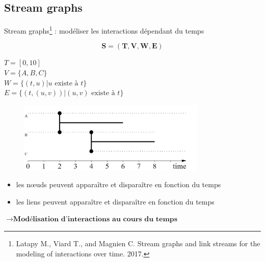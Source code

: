\documentclass[15pt]{beamer}
\def \Stgs {Stream graphs}
\begin{document}
\subsection{Stream graphs}

\begin{frame}{\Stgs{}\footnote{Latapy M., Viard T., and Magnien C. Stream graphs and link streams for the modeling of interactions over time. 2017.} : modéliser les interactions dépendant du temps}


\medskip

\begin{minipage}{0.43\textwidth}
\[
	\mathbf{S=(T,V,W,E)}
\]
\begin{footnotesize}
$T=[0,10]$\\
$V=\{A,B,C\}$\\
$W = \{(t,u) | u \text{ existe à } t\}$\\
$E = \{(t,(u,v)) | (u,v) \text{ existe à } t\}$
\end{footnotesize}
\end{minipage}
\begin{minipage}[r]{0.55\textwidth}
\begin{figure}
    \flushright
    \includegraphics[width=0.8\textwidth]{img/exStreamGraph.JPG}
    \label{fig:exstream}
\end{figure}
\end{minipage}
\medskip

\begin{itemize}
    \item les n\oe{}uds peuvent apparaître et disparaître en fonction du temps
    \item les liens peuvent apparaître et disparaître en fonction du temps
\end{itemize}
\smallskip
\centering
$\rightarrow \textbf{Modélisation d'interactions au cours du temps}$





\end{frame}
\end{document}
